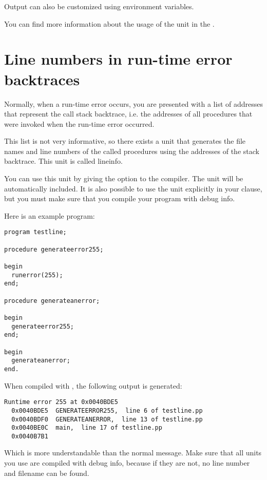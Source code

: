 \begin{ver2}
Output can also be customized using environment variables.
\end{ver2}

You can find more information about the usage of the  unit
in the \unitsref.

\section{Line numbers in run-time error backtraces}
\label{se:lineinfo}

Normally, when a run-time error occurs, you are presented with a list
of addresses that represent the call stack backtrace, i.e. the addresses
of all procedures that were invoked when the run-time error occurred.

This list is not very informative, so there exists a unit that generates
the file names and line numbers of the called procedures using the
addresses of the stack backtrace. This unit is called lineinfo.

You can use this unit by giving the  option to the compiler. The
unit will be automatically included. It is also possible to use the unit
explicitly in your  clause, but you must make sure that you
compile your program with debug info.

Here is an example program:
\begin{verbatim}
program testline;

procedure generateerror255;

begin
  runerror(255);
end;

procedure generateanerror;

begin
  generateerror255;
end;

begin
  generateanerror;
end.
\end{verbatim}
When compiled with , the following output is generated:
\begin{verbatim}
Runtime error 255 at 0x0040BDE5
  0x0040BDE5  GENERATEERROR255,  line 6 of testline.pp
  0x0040BDF0  GENERATEANERROR,  line 13 of testline.pp
  0x0040BE0C  main,  line 17 of testline.pp
  0x0040B7B1
\end{verbatim}
Which is more understandable than the normal message. Make sure that all
units you use are compiled with debug info, because if they are not, no
line number and filename can be found.


